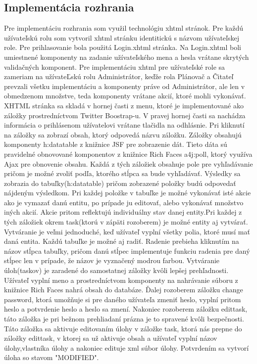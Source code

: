 \subsection{Implementácia rozhrania}
Pre implementáciu rozhrania som využil technológiu xhtml stránok. Pre každú užívateľskú rolu som vytvoril xhtml stránku identitickú s názvom užívateľskej role. Pre prihlasovanie bola použitá Login.xhtml stránka. Na Login.xhtml boli umiestnené komponenty na zadanie užívateľského mena a hesla vrátane skrytých validačných komponent. Pre implementáciu xhtml pre užívateľské role sa zameriam na užívateĽskú rolu Administrátor, keďže rola Plánovač a Čitateľ prevzali všetku implementáciu a komponenty práve od Administrátor, ale len v obmedzenom množstve, teda komponenty vrátane akcií, ktoré mohli vykonávať. XHTML stránka sa skladá v hornej časti z menu, ktoré je implementované ako záložky prostredníctvom Twitter Boostrap-u. V pravej hornej časti sa nachádza informácia o prihlásenom užívatelovi vrátane tlačidla na odhlásnie. Pri kliknutí na záložky sa zobrazí obsah, ktorý odpovedá názvu záložku. Záložky  obsahujú komponenty h:datatable z knižnice JSF pre zobrazenie dát. Tieto dáta sú pravidelné obnovované komponentov z knižnice Rich Faces a4j:poll, ktorý využíva Ajax pre obnovenie obsahu. Každá z tých záložiek obsahuje pole pre vyhľadávanie pričom je možné zvoliť podľa, ktorého stĺpca sa bude vyhľadávať. Výsledky sa zobrazia do tabuľky(h:datatable) pričom zobrazené položky budú odpovedať nájdeným výsledkom. Pri každej položke v tabuľke je možné vykonávať isté akcie ako je vymazať danú entitu, po prípade ju editovať, alebo vykonávať množstvo iných akcií. Akcie pritom reflektujú individuálny stav danej entity.Pri každej z tých záložiek okrem task(ktorú v zápäti rozoberem) je možné entity aj vytvárať. Vytváranie je veľmi jednoduché, keď užívateľ vyplní všetky polia, ktoré musí mať daná entita. Každú tabuľke je možné aj radiť. Radenie prebieha kliknutím na názov stĺpca tabuľky, pričom danú stĺpec implementuje funkciu radenia pre daný stĺpec len v prípade, že názov je vyznačený modrou farbou. Vytváranie úloh(taskov) je zaradené do samostatnej záložky kvôli lepšej prehľadnosti. Užívateľ vyplní meno a prostredníctvom komponenty na nahrávanie súboru z knižnice Rich Faces nahrá obsah do databáze. Ďalej rozoberem záložku change password, ktorá umožňuje si pre daného užívateľa zmeniť heslo, vyplní pritom heslo a potvrdenie heslo a heslo sa zmení. Nakoniec rozoberem záložku edittask, táto záložka je pri bežnom prehliadaní prázna je to spravené kvôli bezpečnosti. Táto záložka sa aktivuje editovaním úlohy v záložke task, ktorá nás prepne do záložky edittask, v ktorej sa už aktivuje obsah a užívateľ vyplní názov úlohy,vlastníka úlohy a nakoniec edituje xml súbor úlohy. Potvrdením sa vytvorí úloha so stavom "MODIFIED".





